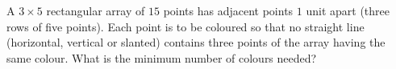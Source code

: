 A $3\times5$ rectangular array of $15$ points has adjacent points $1$ unit apart (three rows of five points). Each point is to be coloured so that no straight line (horizontal, vertical or slanted) contains three points of the array having the same colour. What is the minimum number of colours needed?
